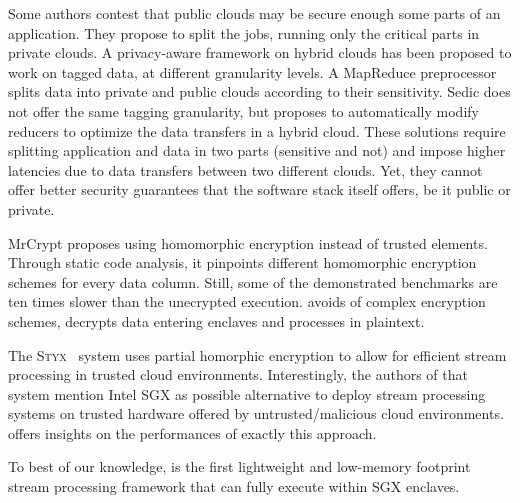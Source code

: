 Some authors contest that public clouds may be secure enough some parts of an application.
They propose to split the jobs, running only the critical parts in private clouds.
A privacy-aware framework on hybrid clouds \cite{xu2015framework} has been proposed to work on tagged data, at different granularity levels.
A MapReduce preprocessor splits data into private and public clouds according to their sensitivity.
Sedic \cite{zhang2011sedic} does not offer the same tagging granularity, but proposes to automatically modify reducers to optimize the data transfers in a hybrid cloud.
These solutions require splitting application and data in two parts (sensitive and not) and impose higher latencies due to data transfers between two different clouds.
Yet, they cannot offer better security guarantees that the software stack itself offers, be it public or private.

MrCrypt \cite{tetali2013mrcrypt} proposes using homomorphic encryption instead of trusted elements.
Through static code analysis, it pinpoints different homomorphic encryption schemes for every data column.
Still, some of the demonstrated benchmarks are ten times slower than the unecrypted execution.
\SYS{} avoids of complex encryption schemes, decrypts data entering enclaves and processes in plaintext.

The \textsc{Styx}~\cite{Stephen:2016:SSP:2987550.2987574} system uses partial homorphic encryption to allow for efficient stream processing in trusted cloud environments.
Interestingly, the authors of that system mention Intel{\textregistered} SGX as possible alternative to deploy stream processing systems on trusted hardware offered by untrusted/malicious cloud environments.
\SYS{} offers insights on the performances of exactly this approach.

To best of our knowledge, \SYS{} is the first lightweight and low-memory footprint stream processing framework that can fully execute within SGX enclaves.
